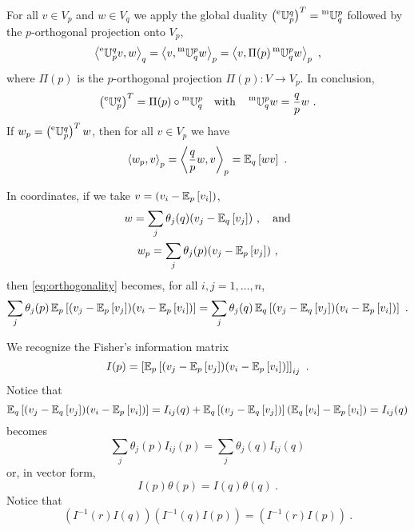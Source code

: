 \documentclass[12pt,a4paper]{amsart}
\begin{document}
For all $v \in V_p$ and $w \in V_q$ we apply the global duality $\left(\etransport p q\right)^T = \mtransport q p$ followed by the $p$-orthogonal projection onto $V_p$,
\begin{equation}
    \scalarat q {\etransport p q v} w = \scalarat p v {\mtransport q p w} = \scalarat p v {\Pi(p) \mtransport {q}{p} w} \ ,
\end{equation}
where $\Pi(p)$ is the $p$-orthogonal projection $\Pi(p) \colon V \to V_p$. In conclusion, \begin{equation}
\left(\etransport p q\right)^T = \Pi(p) \circ \mtransport q p \quad \text{with} \quad \mtransport q p w = \frac q p w \ . 
\end{equation}
If $w_p = \left(\etransport p q\right)^T w$, then for all $v \in V_p$ we have
\begin{equation} \label{eq:orthogonality}
    \scalarat p {w_p} v = \scalarat p {\frac q p w} v = \expectat q {w v} \ . 
\end{equation}

In coordinates, if we take $v= (v_i - \expectat p {v_i})$,
\begin{gather}
    w = \sum_j \theta_j(q) (v_j - \expectat q {v_j}) \ , \quad \text{and} \\
    w_p = \sum_j \theta_j(p)  (v_j - \expectat p {v_j}) \ , 
\end{gather}
then \eqref{eq:orthogonality} becomes, for all $i,j = 1,\dots,n$,
\begin{equation}
  \label{eq:normal-equations}
 \sum_j \theta_j(p) \expectat p {(v_j - \expectat p {v_j})(v_i - \expectat p {v_i})} = \sum_j \theta_j(q) \expectat q {(v_j - \expectat q {v_j})(v_i - \expectat p {v_i})} \ . 
\end{equation}

We recognize the Fisher's information matrix
\begin{equation}
  \label{eq:Fisher-matrix}
  I(p) = \left[\expectat p {(v_j - \expectat p {v_j})(v_i - \expectat p {v_i})}\right]_{ij} \ .
\end{equation}
Notice that
\begin{equation}
\expectat q {(v_j - \expectat q {v_j})(v_i - \expectat p {v_i})} = I_{ij}(q) + \expectat q {(v_j - \expectat q {v_j})}(\expectat q {v_i} - \expectat p {v_i}) = I_{ij}(q)   
\end{equation}
 becomes
\begin{equation}
\sum_j \theta_j(p) I_{ij}(p) = \sum_j \theta_j(q) I_{ij}(q)
\end{equation}
or, in vector form,
\begin{equation}
  \label{eq:vector-normal-equations}
  I(p) \theta(p) = I(q) \theta(q) \ .
\end{equation}
Notice that
\begin{equation}
  \left(I^{-1}(r)I(q)\right)\left(I^{-1}(q)I(p)\right) = \left(I^{-1}(r)I(p)\right) \ .
\end{equation}
\end{document}
